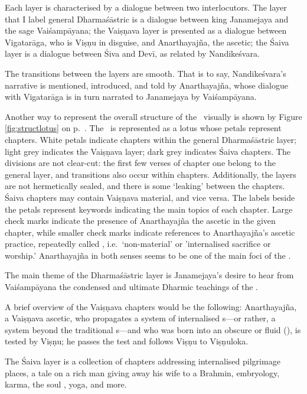 Each layer is characterised by a dialogue between
two interlocutors. The layer that I label general 
Dharmaśāstric is a dialogue between king Janamejaya and the sage
Vaiśampāyana; the Vaiṣṇava layer is presented as
a dialogue between Vigatarāga, who is
Viṣṇu in disguise, and Anarthayajña,\label{anarthayajna_person} the ascetic;
the Śaiva layer is a dialogue between Śiva and Devī,
as related by Nandikeśvara.

The transitions between the layers are smooth. 
That is to say, Nandikeśvara's narrative
is mentioned, introduced, and told by Anarthayajña, whose dialogue
with Vigatarāga is in turn narrated to Janamejaya by Vai\-śampā\-ya\-na.

Another way to represent the overall structure of the \VSS\
visually is shown by Figure \ref{fig:structlotus} 
on p.~\pageref{fig:structlotus}. 
The \VSS\ is represented
as a lotus whose petals represent chapters. White petals indicate chapters within
the general Dharmaśāstric layer; light grey indicates the Vaiṣṇava layer;
dark grey indicates Śaiva chapters. The divisions are not clear-cut: 
the first few verses of chapter one belong to
the general layer, and transitions also occur within chapters.
Additionally, the layers are not hermetically
sealed, and there is some `leaking' between the chapters.
Śaiva chapters may contain Vaiṣṇava material, and vice versa.
The labels beside the petals represent keywords
indicating the main topics of each chapter.
Large check marks indicate the presence of Anarthayajña the ascetic in
the given chapter, while smaller check marks indicate
references to Anarthayajña's ascetic practice,
repeatedly called , 
i.e.\ `non-material' or 'internali\-sed sacrifice or worship.'\label{nonmaterial}
Anarthayajña in both senses seems to be one of the 
main foci of the \VSS.

The main theme of the Dharmaśāstric layer is Janamejaya's desire 
to hear from Vaiśampāyana the condensed and ultimate Dharmic teachings of the \MBh.

A brief overview of the Vaiṣṇava chapters would be the following:
An\-artha\-yajña, a Vaiṣṇava ascetic, who propagates
a system of internalised s---or rather,
a system beyond the traditional s---and
who was born into an obscure or fluid  
(),
is tested by Viṣṇu; he passes the test
and follows Viṣṇu to Viṣṇuloka.

The Śaiva layer is a collection of chapters addressing internalised
pilgrimage places, a tale on a rich man giving away his wife to a Brahmin,
embryology, karma, the soul \ie{jīva}, yoga, and more.

